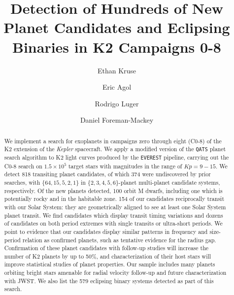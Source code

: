 \documentclass[twocolumn]{aastex62}
\newcommand{\project}[1]{\textsl{#1}}
\newcommand{\pipeline}[1]{\texttt{#1}}
\newcommand{\nplanet}{818}
\newcommand{\nnewplanet}{374}
\newcommand{\nebs}{579}
\newcommand{\nmdwarfcands}{100}
\begin{document}
\title{Detection of Hundreds of New Planet Candidates and Eclipsing
  Binaries in K2 Campaigns 0-8}


\author[0000-0002-0493-1342]{Ethan Kruse}

\author[0000-0002-0802-9145]{Eric Agol}
  
\author[0000-0002-0296-3826]{Rodrigo Luger}

\author[0000-0002-9328-5652]{Daniel Foreman-Mackey}


\begin{abstract}
We implement a search for exoplanets in campaigns zero through eight
(C0-8) of the K2 extension of the \project{Kepler} spacecraft.  We
apply a modified version of the \pipeline{QATS} planet search
algorithm to K2 light curves produced by the \pipeline{EVEREST}
pipeline, carrying out the C0-8 search on $1.5\times 10^5$ target
stars with magnitudes in the range of $Kp = 9-15$.  We detect
\nplanet{} transiting planet candidates, of which \nnewplanet{} were
undiscovered by prior searches, with $\{64, 15, 5, 2, 1\}$ in
$\{2,3,4,5,6\}$-planet multi-planet candidate systems, respectively.
Of the new planets detected, \nmdwarfcands{} orbit M dwarfs, including
one which is potentially rocky and in the habitable zone.  154 of our
candidates reciprocally transit with our Solar System: they are
geometrically aligned to see at least one Solar System planet
transit. We find candidates which display transit timing variations
and dozens of candidates on both period extremes with single transits
or ultra-short periods.  We point to evidence that our candidates
display similar patterns in frequency and size-period relation as
confirmed planets, such as tentative evidence for the radius gap.
Confirmation of these planet candidates with follow-up studies will
increase the number of K2 planets by up to 50\%, and characterization
of their host stars will improve statistical studies of planet
properties.  Our sample includes many planets orbiting bright stars
amenable for radial velocity follow-up and future characterization
with JWST. We also list the \nebs{} eclipsing binary systems detected
as part of this search.
\end{abstract}
\end{document}
